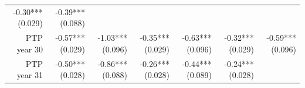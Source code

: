 \documentclass[]{article}
\begin{document}
\begin{longtable}[c]{@{}rrrrrrr@{}}
\begin{minipage}[t]{0.11\columnwidth}
-0.30*** (0.029)
\strut\end{minipage} &
\begin{minipage}[t]{0.11\columnwidth}\raggedleft\strut
-0.39*** (0.088)
\strut\end{minipage}\tabularnewline
\begin{minipage}[t]{0.12\columnwidth}\raggedleft\strut
PTP year 30
\strut\end{minipage} &
\begin{minipage}[t]{0.11\columnwidth}\raggedleft\strut
-0.57*** (0.029)
\strut\end{minipage} &
\begin{minipage}[t]{0.12\columnwidth}\raggedleft\strut
-1.03*** (0.096)
\strut\end{minipage} &
\begin{minipage}[t]{0.11\columnwidth}\raggedleft\strut
-0.35*** (0.029)
\strut\end{minipage} &
\begin{minipage}[t]{0.12\columnwidth}\raggedleft\strut
-0.63*** (0.096)
\strut\end{minipage} &
\begin{minipage}[t]{0.11\columnwidth}\raggedleft\strut
-0.32*** (0.029)
\strut\end{minipage} &
\begin{minipage}[t]{0.11\columnwidth}\raggedleft\strut
-0.59*** (0.096)
\strut\end{minipage}\tabularnewline
\begin{minipage}[t]{0.12\columnwidth}\raggedleft\strut
PTP year 31
\strut\end{minipage} &
\begin{minipage}[t]{0.11\columnwidth}\raggedleft\strut
-0.50*** (0.028)
\strut\end{minipage} &
\begin{minipage}[t]{0.12\columnwidth}\raggedleft\strut
-0.86*** (0.088)
\strut\end{minipage} &
\begin{minipage}[t]{0.11\columnwidth}\raggedleft\strut
-0.26*** (0.028)
\strut\end{minipage} &
\begin{minipage}[t]{0.12\columnwidth}\raggedleft\strut
-0.44*** (0.089)
\strut\end{minipage} &
\begin{minipage}[t]{0.11\columnwidth}\raggedleft\strut
-0.24*** (0.028)
\strut\end{minipage} &
\begin{minipage}[t]{0.11\columnwidth}\raggedleft\strut

\end{minipage}
\end{longtable}
\end{document}
